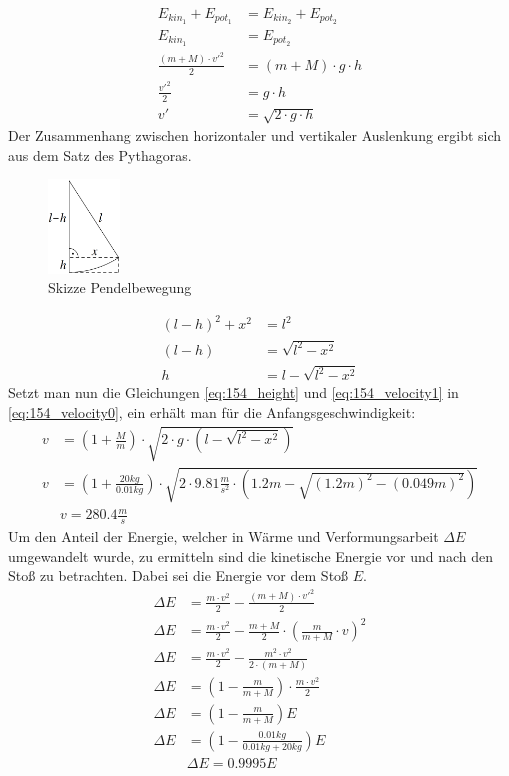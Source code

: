 \documentclass{article}
\begin{document}
	\begin{align}
		E_{kin_1}+E_{pot_1}&=E_{kin_2}+E_{pot_2}		\nonumber\\
		E_{kin_1}&=E_{pot_2}							\nonumber\\
		\frac{(m+M)\cdot v'^2}{2}&=(m+M)\cdot g\cdot h	\nonumber\\
		\frac{v'^2}{2}&=g\cdot h						\nonumber\\
		v'&=\sqrt{2\cdot g\cdot h}						\label{eq:154_velocity1}
	\end{align}
	Der Zusammenhang zwischen horizontaler und vertikaler Auslenkung ergibt sich aus dem Satz des Pythagoras.
	\begin{figure}[h]
		\centering
		\includegraphics[height=2.5cm]{images/154_1.png}
		\caption{Skizze Pendelbewegung}
	\end{figure}
	\begin{align}
		(l-h)^2+x^2&=l^2		\nonumber\\
		(l-h)&=\sqrt{l^2-x^2}	\nonumber\\
		h&=l-\sqrt{l^2-x^2}		\label{eq:154_height}
	\end{align}
	Setzt man nun die Gleichungen \eqref{eq:154_height} und \eqref{eq:154_velocity1} in \eqref{eq:154_velocity0}, ein erhält man für die Anfangsgeschwindigkeit:
	\begin{align*}
		v&=\left(1+\frac{M}{m}\right)\cdot\sqrt{2\cdot g\cdot\left(l-\sqrt{l^2-x^2}\right)}\\
		v&=\left(1+\frac{20kg}{0.01kg}\right)\cdot\sqrt{2\cdot 9.81\frac{m}{s^2}\cdot\left(1.2m-\sqrt{(1.2m)^2-(0.049m)^2}\right)}\\
		&\boxed{v=280.4\frac{m}{s}}		\tag{a} \label{eq:154_a}
	\end{align*}
	Um den Anteil der Energie, welcher in Wärme und Verformungsarbeit $\Delta E$ umgewandelt wurde, zu ermitteln sind die kinetische Energie vor und nach den Stoß zu betrachten. Dabei sei die Energie vor dem Stoß $E$.
	\begin{align*}
		\Delta E&=\frac{m\cdot v^2}{2}-\frac{(m+M)\cdot v'^2}{2}\\
		\Delta E&=\frac{m\cdot v^2}{2}-\frac{m+M}{2}\cdot \left(\frac{m}{m+M}\cdot v\right)^2\\
		\Delta E&=\frac{m\cdot v^2}{2}-\frac{m^2\cdot v^2}{2\cdot(m+M)}\\
		\Delta E&=\left(1-\frac{m}{m+M}\right)\cdot\frac{m\cdot v^2}{2}\\
		\Delta E&=\left(1-\frac{m}{m+M}\right)E\\
		\Delta E&=\left(1-\frac{0.01kg}{0.01kg+20kg}\right)E\\
		&\boxed{\Delta E=0.9995E}		\tag{b}	\label{eq:154_b}
	\end{align*}
	\newpage
	
\end{document}
